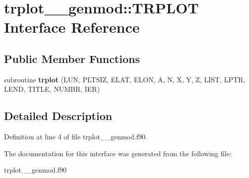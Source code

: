 \hypertarget{interfacetrplot____genmod_1_1_t_r_p_l_o_t}{\section{trplot\+\_\+\+\_\+genmod\+:\+:T\+R\+P\+L\+O\+T Interface Reference}
\label{interfacetrplot____genmod_1_1_t_r_p_l_o_t}
}
\subsection*{Public Member Functions}
\begin{DoxyCompactItemize}
\item 
\hypertarget{interfacetrplot____genmod_1_1_t_r_p_l_o_t_a8ffb60ef0c246eec7521240bde342c2c}{subroutine {\bfseries trplot} (L\+U\+N, P\+L\+T\+S\+I\+Z, E\+L\+A\+T, E\+L\+O\+N, A, N, X, Y, Z, L\+I\+S\+T, L\+P\+T\+R, L\+E\+N\+D, T\+I\+T\+L\+E, N\+U\+M\+B\+R, I\+E\+R)}\label{interfacetrplot____genmod_1_1_t_r_p_l_o_t_a8ffb60ef0c246eec7521240bde342c2c}

\end{DoxyCompactItemize}


\subsection{Detailed Description}


Definition at line 4 of file trplot\+\_\+\+\_\+genmod.\+f90.



The documentation for this interface was generated from the following file\+:\begin{DoxyCompactItemize}
\item 
trplot\+\_\+\+\_\+genmod.\+f90\end{DoxyCompactItemize}
